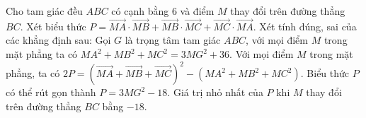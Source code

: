 \begin{ex}%
	Cho tam giác đều $ABC$ có cạnh bằng $6$ và điểm $M$ thay đổi trên đường thẳng $BC$. Xét biểu thức $P=\overrightarrow{MA}\cdot\overrightarrow{MB}+\overrightarrow{MB}\cdot\overrightarrow{MC}+\overrightarrow{MC}\cdot\overrightarrow{MA}$. Xét tính đúng, sai của các khẳng định sau:
	\choiceTF
	{\True Gọi $G$ là trọng tâm tam giác $ABC$, với mọi điểm $M$ trong mặt phẳng ta có $MA^2+MB^2+MC^2=3MG^2+36$.}
	{\True Với mọi điểm $M$ trong mặt phẳng, ta có $2P=(\overrightarrow{MA}+\overrightarrow{MB}+\overrightarrow{MC})^2-(MA^2+MB^2+MC^2)$.}
	{\True Biểu thức $P$ có thể rút gọn thành $P=3MG^2-18$.}
	{Giá trị nhỏ nhất của $P$ khi $M$ thay đổi trên đường thẳng $BC$ bằng $-18$.}
\end{ex}

